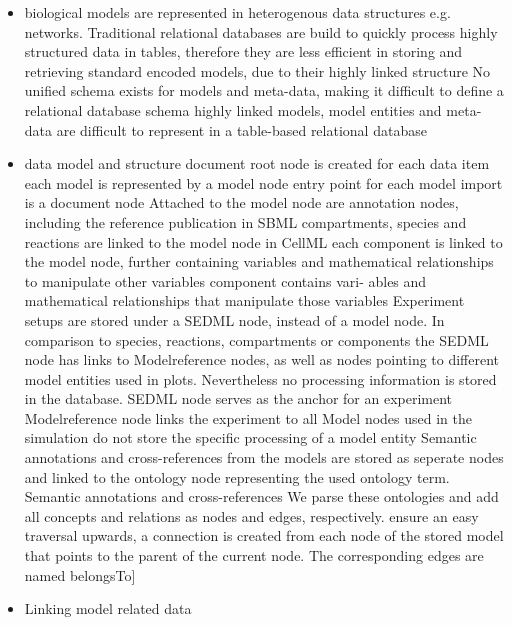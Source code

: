 \begin{itemize}
	\item \cite{Henkel2015} biological models are represented in heterogenous data structures e.g. networks. Traditional relational databases are build to quickly process highly structured data in tables, therefore they are less efficient in storing and retrieving standard encoded models, due to their highly linked structure
	\subitem \cite{Henkel2015} No unified schema exists for models and meta-data, making it difficult to define a relational database schema
	\subitem \cite{Henkel2015} highly linked models, model entities and meta-data are difficult to represent in a table-based relational database
	\item \masymos data model and structure
	\subitem \cite{Henkel2015} document root node is created for each data item
	\subitem each model is represented by a model node
	\subsubitem entry point for each model import is a document node
	\subitem \cite{Henkel2015} Attached to the model node are annotation nodes, including the reference publication
	\subitem in SBML compartments, species and reactions are linked to the model node
	\subitem in CellML each component is linked to the model node, further containing variables and mathematical relationships to manipulate other variables
	\subsubitem \cite{Henkel2015} component contains vari- ables and mathematical relationships that manipulate those variables
	\subitem Experiment setups are stored under a SEDML node, instead of a model node. In comparison to species, reactions, compartments or components the SEDML node has links to Modelreference nodes, as well as nodes pointing to different model entities used in plots. Nevertheless no processing information is stored in the database.
	\subsubitem \cite{Henkel2015} SEDML node serves as the anchor for an experiment
	\subsubitem \cite{Henkel2015} Modelreference node links the experiment to all Model nodes used in the simulation
	\subsubitem \cite{Henkel2015} do not store the specific processing of a model entity
	\subitem Semantic annotations and cross-references from the models are stored as seperate nodes and linked to the ontology node representing the used ontology term.
	\subsubitem \cite{Henkel2015} Semantic annotations and cross-references
	\subsubitem \cite{Henkel2015} We parse these ontologies and add all concepts and relations as nodes and edges, respectively.
	\subitem ensure an easy traversal upwards, a connection is created from each node of the stored model that points to the parent of the current node. The corresponding edges are named belongsTo]
	\item Linking model related data

\end{itemize}
